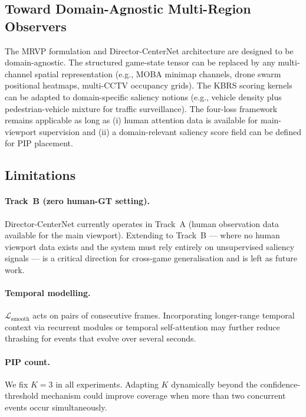\documentclass[preprint,12pt]{elsarticle}
\begin{document}
\subsection{Toward Domain-Agnostic Multi-Region Observers}

The MRVP formulation and Director-CenterNet architecture are 
designed to be domain-agnostic. The structured game-state tensor can be 
replaced by any multi-channel spatial representation (e.g., MOBA minimap 
channels, drone swarm positional heatmaps, multi-CCTV occupancy grids). 
The KBRS scoring kernels can be adapted to domain-specific saliency notions 
(e.g., vehicle density plus pedestrian-vehicle mixture for traffic 
surveillance). The four-loss framework remains applicable as long as (i) 
human attention data is available for main-viewport supervision and (ii) a 
domain-relevant saliency score field can be defined for PIP placement.

\subsection{Limitations}

\paragraph{Track~B (zero human-GT setting).} Director-CenterNet currently 
operates in Track~A (human observation data available for the main viewport). 
Extending to Track~B — where no human viewport data exists and the system 
must rely entirely on unsupervised saliency signals — is a critical direction 
for cross-game generalisation and is left as future work.

\paragraph{Temporal modelling.} $\mathcal{L}_{\text{smooth}}$ acts on 
pairs of consecutive frames. Incorporating longer-range temporal context via 
recurrent modules or temporal self-attention may further reduce thrashing 
for events that evolve over several seconds.

\paragraph{PIP count.} We fix $K=3$ in all experiments. Adapting $K$ 
dynamically beyond the confidence-threshold mechanism could improve coverage 
when more than two concurrent events occur simultaneously.
\end{document}
